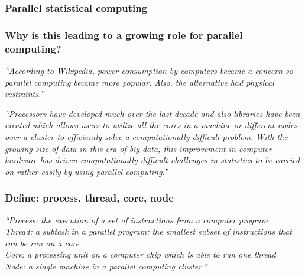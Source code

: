 \documentclass[12pt]{beamer}
\newcommand\ans[1]{{\it ``#1''}}
\newcommand\gap{\vspace{5mm}}
\begin{document}

\begin{frame}
  \frametitle{Parallel statistical computing}
    
\end{frame}

\begin{frame} %

  \frametitle{Why is this leading to a growing role for parallel computing?}

  \ans{According to Wikipedia, power consumption by computers became a concern so parallel computing became more popular.  Also, the alternative had physical restraints.}
  
\end{frame}

\begin{frame}
  \ans{Processors  have  developed  much  over  the  last  decade  and  also  libraries  have  been created which allows users to utilize all the cores in a machine or different nodes over a  cluster  to  efficiently  solve  a  computationally  difficult  problem.   With  the  growing size of data in this era of big data, this improvement in computer hardware has driven computationally difficult challenges in statistics to be carried on rather easily by using parallel computing.}
  
  \end{frame}

\begin{frame} %

  \frametitle{Define: process, thread, core, node}

  \ans{Process:  the execution of a set of instructions from a computer program\\
    \gap
    Thread:  a subtask in a parallel program; the smallest subset of instructions that can be run on a core\\
    \gap
    Core:  a processing unit on a computer chip which is able to run one thread\\
    \gap
    Node:  a single machine in a parallel computing cluster.}
  \end{frame}
\end{document}
